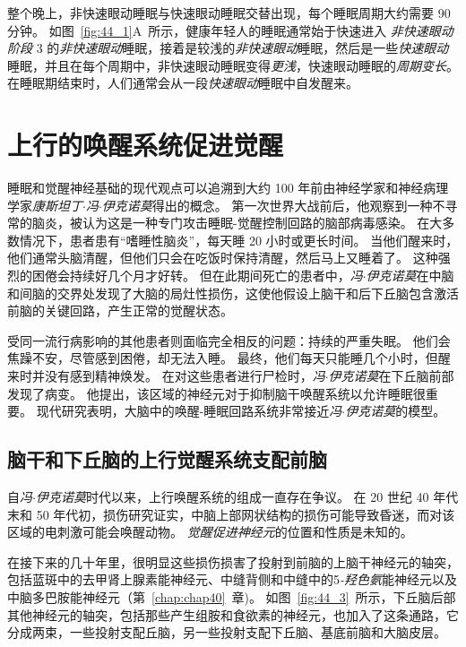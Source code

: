 整个晚上，非快速眼动睡眠与快速眼动睡眠交替出现，每个睡眠周期大约需要 90 分钟。
如图~\ref{fig:44_1}A~所示，健康年轻人的睡眠通常始于快速进入 \textit{非快速眼动阶段} 3 的\textit{非快速眼动}睡眠，接着是较浅的\textit{非快速眼动}睡眠，然后是一些\textit{快速眼动}睡眠，并且在每个周期中，非快速眼动睡眠变得\textit{更浅}，快速眼动睡眠的\textit{周期变长}。
在睡眠期结束时，人们通常会从一段\textit{快速眼动}睡眠中自发醒来。



\section{上行的唤醒系统促进觉醒}

睡眠和觉醒神经基础的现代观点可以追溯到大约 100 年前由神经学家和神经病理学家\textit{康斯坦丁$\cdot$冯$\cdot$伊克诺莫}得出的概念。
第一次世界大战前后，他观察到一种不寻常的脑炎，被认为这是一种专门攻击睡眠-觉醒控制回路的脑部病毒感染。
在大多数情况下，患者患有“嗜睡性脑炎”，每天睡 20 小时或更长时间。
当他们醒来时，他们通常头脑清醒，但他们只会在吃饭时保持清醒，然后马上又睡着了。
这种强烈的困倦会持续好几个月才好转。
但在此期间死亡的患者中，\textit{冯$\cdot$伊克诺莫}在中脑和间脑的交界处发现了大脑的局灶性损伤，这使他假设上脑干和后下丘脑包含激活前脑的关键回路，产生正常的觉醒状态。


受同一流行病影响的其他患者则面临完全相反的问题：持续的严重失眠。
他们会焦躁不安，尽管感到困倦，却无法入睡。
最终，他们每天只能睡几个小时，但醒来时并没有感到精神焕发。
在对这些患者进行尸检时，\textit{冯$\cdot$伊克诺莫}在下丘脑前部发现了病变。
他提出，该区域的神经元对于抑制脑干唤醒系统以允许睡眠很重要。
现代研究表明，大脑中的唤醒-睡眠回路系统非常接近\textit{冯$\cdot$伊克诺莫}的模型。



\subsection{脑干和下丘脑的上行觉醒系统支配前脑}

自\textit{冯$\cdot$伊克诺莫}时代以来，上行唤醒系统的组成一直存在争议。
在 20 世纪 40 年代末和 50 年代初，损伤研究证实，中脑上部网状结构的损伤可能导致昏迷，而对该区域的电刺激可能会唤醒动物。
\textit{觉醒促进神经元}的位置和性质是未知的。


在接下来的几十年里，很明显这些损伤损害了投射到前脑的上脑干神经元的轴突，包括蓝斑中的去甲肾上腺素能神经元、中缝背侧和中缝中的5\textit{-羟色氨}能神经元以及中脑多巴胺能神经元（第~\ref{chap:chap40}~章)。
如图~\ref{fig:44_3}~所示，下丘脑后部其他神经元的轴突，包括那些产生组胺和食欲素的神经元，也加入了这条通路，它分成两束，一些投射支配丘脑，另一些投射支配下丘脑、基底前脑和大脑皮层。


